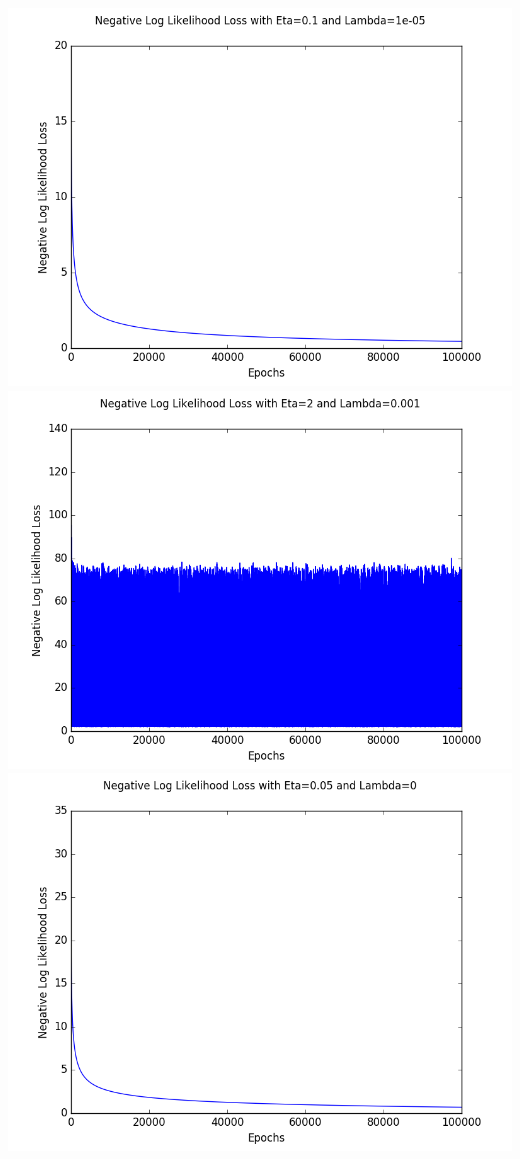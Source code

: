 \documentclass[submit]{harvardml}
\begin{document}
\begin{enumerate}
        \includegraphics[scale=.40]{hw2/P3_Pics/eta=0.1lam=.00001.png}
        \includegraphics[scale=.40]{hw2/P3_Pics/eta=2lam=.001.png}
        \includegraphics[scale=.40]{hw2/P3_Pics/nolam.png}

\end{enumerate}
\end{document}
